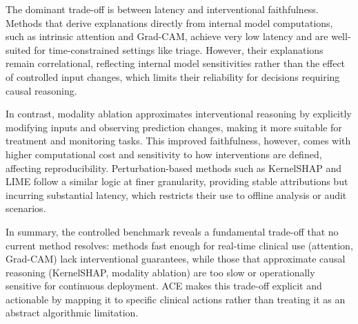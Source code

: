 \documentclass[pdflatex,sn-mathphys-num]{sn-jnl}%
\theoremstyle{thmstyleone}%
\theoremstyle{thmstyletwo}%
\theoremstyle{thmstylethree}%
\begin{document}
\begin{itemize}

The dominant trade-off is between latency and interventional faithfulness. Methods that derive explanations directly from internal model computations, such as intrinsic attention and Grad-CAM, achieve very low latency and are well-suited for time-constrained settings like triage. However, their explanations remain correlational, reflecting internal model sensitivities rather than the effect of controlled input changes, which limits their reliability for decisions requiring causal reasoning.

In contrast, modality ablation approximates interventional reasoning by explicitly modifying inputs and observing prediction changes, making it more suitable for treatment and monitoring tasks. This improved faithfulness, however, comes with higher computational cost and sensitivity to how interventions are defined, affecting reproducibility. Perturbation-based methods such as KernelSHAP and LIME follow a similar logic at finer granularity, providing stable attributions but incurring substantial latency, which restricts their use to offline analysis or audit scenarios.

In summary, the controlled benchmark reveals a fundamental trade-off that no current method resolves: methods fast enough for real-time clinical use (attention, Grad-CAM) lack interventional guarantees, while those that approximate causal reasoning (KernelSHAP, modality ablation) are too slow or operationally sensitive for continuous deployment. ACE makes this trade-off explicit and actionable by mapping it to specific clinical actions rather than treating it as an abstract algorithmic limitation.


\end{itemize}
\end{document}
